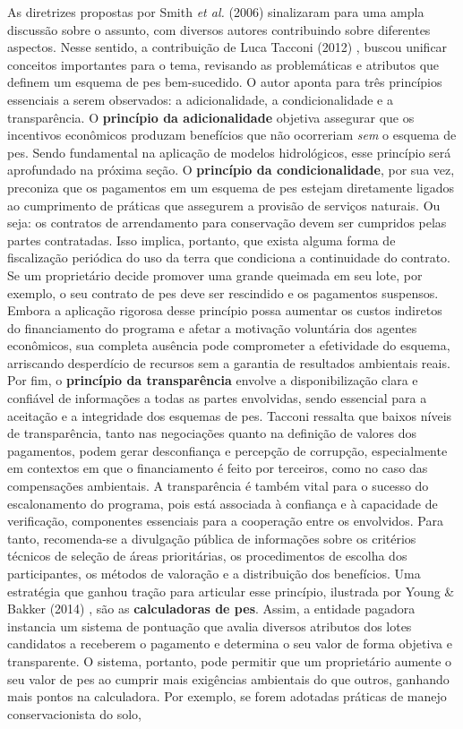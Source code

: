 \documentclass[./main.tex]{subfiles}
\begin{document}
\par As diretrizes propostas por Smith \textit{et al.} (2006) sinalizaram para uma ampla discussão sobre o assunto, com diversos autores contribuindo sobre diferentes aspectos. Nesse sentido, a contribuição de Luca Tacconi (2012) \cite{Tacconi2012a}, buscou unificar conceitos importantes para o tema, revisando as problemáticas e atributos que definem um esquema de \acrshort{pes} bem-sucedido. O autor aponta para três princípios essenciais a serem observados: a adicionalidade, a condicionalidade e a transparência. O \textbf{princípio da adicionalidade} objetiva assegurar que os incentivos econômicos produzam benefícios que não ocorreriam \textit{sem} o esquema de \acrshort{pes}. Sendo fundamental na aplicação de modelos hidrológicos, esse princípio será aprofundado na próxima seção. O \textbf{princípio da condicionalidade}, por sua vez, preconiza que os pagamentos em um esquema de \acrshort{pes} estejam diretamente ligados ao cumprimento de práticas que assegurem a provisão de serviços naturais. Ou seja: os contratos de arrendamento para conservação devem ser cumpridos pelas partes contratadas. Isso implica, portanto, que exista alguma forma de fiscalização periódica do uso da terra que condiciona a continuidade do contrato. Se um proprietário decide promover uma grande queimada em seu lote, por exemplo, o seu contrato de \acrshort{pes} deve ser rescindido e os pagamentos suspensos. Embora a aplicação rigorosa desse princípio possa aumentar os custos indiretos do financiamento do programa e afetar a motivação voluntária dos agentes econômicos, sua completa ausência pode comprometer a efetividade do esquema, arriscando desperdício de recursos sem a garantia de resultados ambientais reais. Por fim, o \textbf{princípio da transparência} envolve a disponibilização clara e confiável de informações a todas as partes envolvidas, sendo essencial para a aceitação e a integridade dos esquemas de \acrshort{pes}. Tacconi ressalta que baixos níveis de transparência, tanto nas negociações quanto na definição de valores dos pagamentos, podem gerar desconfiança e percepção de corrupção, especialmente em contextos em que o financiamento é feito por terceiros, como no caso das compensações ambientais. A transparência é também vital para o sucesso do escalonamento do programa, pois está associada à confiança e à capacidade de verificação, componentes essenciais para a cooperação entre os envolvidos. Para tanto, recomenda-se a divulgação pública de informações sobre os critérios técnicos de seleção de áreas prioritárias, os procedimentos de escolha dos participantes, os métodos de valoração e a distribuição dos benefícios. Uma estratégia que ganhou tração para articular esse princípio, ilustrada por Young \& Bakker (2014) \cite{Young2014a}, são as \textbf{calculadoras de \acrshort{pes}}. Assim, a entidade pagadora instancia um sistema de pontuação que avalia diversos atributos dos lotes candidatos a receberem o pagamento e determina o seu valor de forma objetiva e transparente. O sistema, portanto, pode permitir que um proprietário aumente o seu valor de \acrshort{pes} ao cumprir mais exigências ambientais do que outros, ganhando mais pontos na calculadora. Por exemplo, se forem adotadas práticas de manejo conservacionista do solo, 
\end{document}
